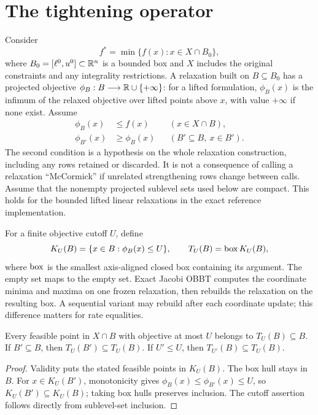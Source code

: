 \section{The tightening operator}\label{sec:foundations}

Consider
\begin{equation}\label{eq:problem}
 f^*=\min\{f(x):x\in X\cap B_0\},
\end{equation}
where $B_0=[\ell^0,u^0]\subset\mathbb R^n$ is a bounded box and $X$ includes
the original constraints and any integrality restrictions. A relaxation
built on $B\subseteq B_0$ has a projected objective
$\phi_B:B\longrightarrow\mathbb R\cup\{+\infty\}$: for a lifted formulation,
$\phi_B(x)$ is the infimum of the relaxed objective over lifted points
above $x$, with value $+\infty$ if none exist. Assume
\begin{align}
 \phi_B(x)&\le f(x) &&(x\in X\cap B),\label{eq:validity}\\
 \phi_{B'}(x)&\ge\phi_B(x) &&(B'\subseteq B,\ x\in B').\label{eq:monotonicity}
\end{align}
The second condition is a hypothesis on the whole relaxation construction,
including any rows retained or discarded. It is not a consequence of
calling a relaxation ``McCormick'' if unrelated strengthening rows change
between calls. Assume that the nonempty projected sublevel sets used
below are compact. This holds for the bounded lifted linear relaxations
in the exact reference implementation.

For a finite objective cutoff $U$, define
\begin{equation}\label{eq:operator}
 K_U(B)=\{x\in B:\phi_B(x)\le U\},\qquad
 T_U(B)=\operatorname{box} K_U(B),
\end{equation}
where $\operatorname{box}$ is the smallest axis-aligned closed box containing its
argument. The empty set maps to the empty set. Exact Jacobi OBBT computes
the coordinate minima and maxima on one frozen relaxation, then rebuilds
the relaxation on the resulting box. A sequential variant may rebuild
after each coordinate update; this difference matters for rate equalities.

\begin{lemma}\label{lem:order}
Every feasible point in $X\cap B$ with objective at most $U$ belongs to
$T_U(B)\subseteq B$. If $B'\subseteq B$, then
$T_U(B')\subseteq T_U(B)$. If $U'\le U$, then
$T_{U'}(B)\subseteq T_U(B)$.
\end{lemma}
\begin{proof}
Validity puts the stated feasible points in $K_U(B)$. The box hull stays
in $B$. For $x\in K_U(B')$, monotonicity gives
$\phi_B(x)\le\phi_{B'}(x)\le U$, so $K_U(B')\subseteq K_U(B)$;
taking box hulls preserves inclusion. The cutoff assertion follows
directly from sublevel-set inclusion.
\end{proof}

